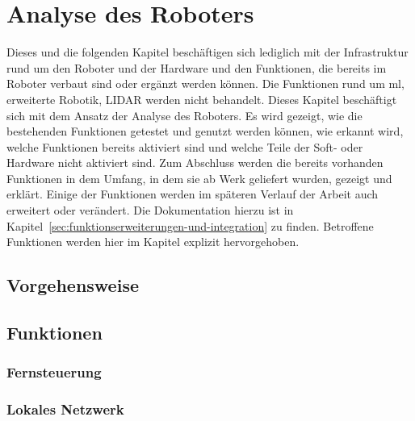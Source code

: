 \section{Analyse des Roboters}
\label{sec:analyse-des-roboters}
Dieses und die folgenden Kapitel beschäftigen sich lediglich mit der Infrastruktur rund um den Roboter
und der Hardware und den Funktionen, die bereits im Roboter verbaut sind oder ergänzt werden können.
Die Funktionen rund um \gls{ml}, erweiterte Robotik,  LIDAR werden nicht behandelt.
Dieses Kapitel beschäftigt sich mit dem Ansatz der Analyse des Roboters.
Es wird gezeigt, wie die bestehenden Funktionen getestet und genutzt werden können, wie erkannt wird,
welche Funktionen bereits aktiviert sind und welche Teile der Soft- oder Hardware nicht aktiviert sind.
Zum Abschluss werden die bereits vorhanden Funktionen in dem Umfang, in dem sie ab Werk geliefert wurden,
gezeigt und erklärt.
Einige der Funktionen werden im späteren Verlauf der Arbeit auch erweitert oder verändert.
Die Dokumentation hierzu ist in Kapitel~\ref{sec:funktionserweiterungen-und-integration} zu finden.
Betroffene Funktionen werden hier im Kapitel explizit hervorgehoben.


\subsection{Vorgehensweise}
\label{subsec:vorgehensweise}

\subsection{Funktionen}
\label{subsec:funktionen}

\subsubsection{Fernsteuerung}

\subsubsection{Lokales Netzwerk}

